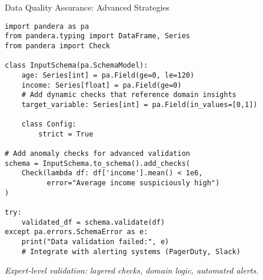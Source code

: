 \documentclass[aspectratio=169]{beamer}
\begin{document}
\begin{frame}{Data Quality Assurance: Advanced Strategies}
\begin{verbatim}
import pandera as pa
from pandera.typing import DataFrame, Series
from pandera import Check

class InputSchema(pa.SchemaModel):
    age: Series[int] = pa.Field(ge=0, le=120)
    income: Series[float] = pa.Field(ge=0)
    # Add dynamic checks that reference domain insights
    target_variable: Series[int] = pa.Field(in_values=[0,1])

    class Config:
        strict = True

# Add anomaly checks for advanced validation
schema = InputSchema.to_schema().add_checks(
    Check(lambda df: df['income'].mean() < 1e6,
          error="Average income suspiciously high")
)

try:
    validated_df = schema.validate(df)
except pa.errors.SchemaError as e:
    print("Data validation failed:", e)
    # Integrate with alerting systems (PagerDuty, Slack)
\end{verbatim}

\emph{Expert-level validation: layered checks, domain logic, automated alerts.}
\end{frame}
\end{document}
